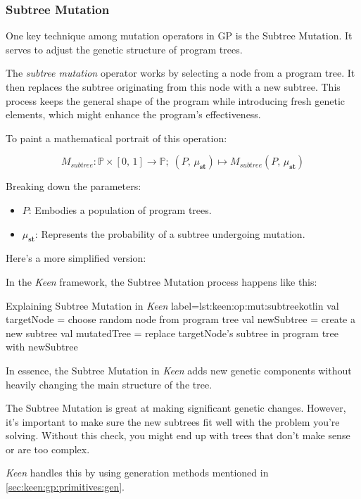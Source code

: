 \subsubsection{Subtree Mutation}
\label{sec:keen:op:mut:subtree}
  One key technique among mutation operators in GP is the Subtree Mutation. It 
  serves to adjust the genetic structure of program trees.

  \begin{definition}
    The \textit{subtree mutation} operator works by selecting a node from a 
    program tree. It then replaces the subtree originating from this node with 
    a new subtree. This process keeps the general shape of the program while 
    introducing fresh genetic elements, which might enhance the program's 
    effectiveness.

    To paint a mathematical portrait of this operation:

    \begin{equation}
      M_{subtree}: \mathbb{P} \times [0,\, 1] \to \mathbb{P};\;
        (P,\, \mu_\textbf{st}) \mapsto M_{subtree}(P,\, \mu_\textbf{st})
    \end{equation}

    Breaking down the parameters:

    \begin{itemize}
      \item \(P\): Embodies a population of program trees.
      \item \(\mu_\textbf{st}\): Represents the probability of a subtree 
        undergoing mutation.
    \end{itemize}
  \end{definition}

  Here's a more simplified version:

  In the \textit{Keen} framework, the Subtree Mutation process happens like 
  this:

  \begin{code}{
    Explaining Subtree Mutation in \textit{Keen}
  }{label=lst:keen:op:mut:subtree}{kotlin}
    val targetNode = choose random node from program tree
    val newSubtree = create a new subtree
    val mutatedTree = replace targetNode's subtree in program tree with newSubtree
  \end{code}

  In essence, the Subtree Mutation in \textit{Keen} adds new genetic components 
  without heavily changing the main structure of the tree.

  \begin{remark}
    The Subtree Mutation is great at making significant genetic changes. 
    However, it's important to make sure the new subtrees fit well with the 
    problem you're solving. Without this check, you might end up with trees 
    that don't make sense or are too complex.

    \textit{Keen} handles this by using generation methods mentioned in 
    \vref{sec:keen:gp:primitives:gen}.
  \end{remark}


